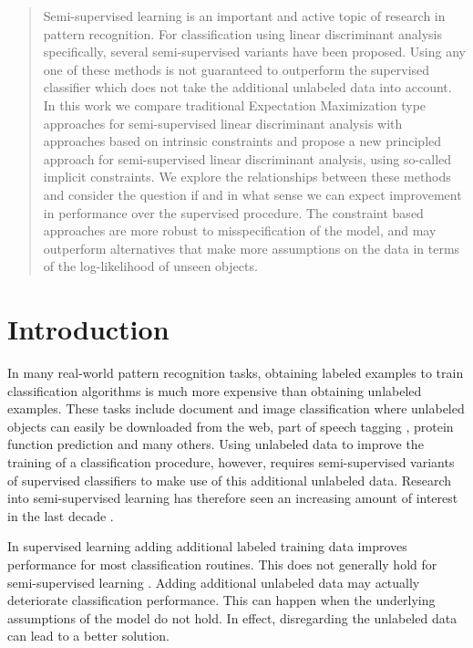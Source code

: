 
\begin{abstract}
Semi-supervised learning is an important and active topic of research in pattern recognition. For classification using linear discriminant analysis specifically, several semi-supervised variants have been proposed. Using any one of these methods is not guaranteed to outperform the supervised classifier which does not take the additional unlabeled data into account. In this work we compare traditional Expectation Maximization type approaches for semi-supervised linear discriminant analysis with approaches based on intrinsic constraints and propose a new principled approach for semi-supervised linear discriminant analysis, using so-called implicit constraints. We explore the relationships between these methods and consider the question if and in what sense we can expect improvement in performance over the supervised procedure. The constraint based approaches are more robust to misspecification of the model, and may outperform alternatives that make more assumptions on the data in terms of the log-likelihood of unseen objects.
\end{abstract}

\section{Introduction}
In many real-world pattern recognition tasks, obtaining labeled examples to train classification algorithms is much more expensive than obtaining unlabeled examples. These tasks include document and image classification \cite{Nigam2000} where unlabeled objects can easily be downloaded from the web, part of speech tagging \cite{Elworthy1994}, protein function prediction \cite{Weston2005} and many others. Using unlabeled data to improve the training of a classification procedure, however, requires semi-supervised variants of supervised classifiers to make use of this additional unlabeled data. Research into semi-supervised learning has therefore seen an increasing amount of interest in the last decade \cite{Chapelle2006}.

In supervised learning adding additional labeled training data improves performance for most classification routines. This does not generally hold for semi-supervised learning \cite{Cozman2006}. Adding additional unlabeled data may actually deteriorate classification performance. This can happen when the underlying assumptions of the model do not hold. In effect, disregarding the unlabeled data can lead to a better solution.

